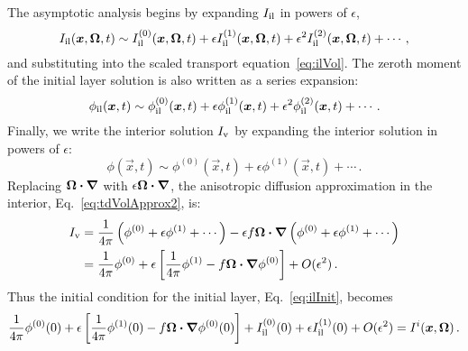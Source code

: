 The asymptotic analysis begins by expanding $I_\mathrm{il}$ in powers of $\epsilon$,
\begin{equation*}
  I_\mathrm{il}(\bm{x},\bm{\Omega},t) \sim I_\mathrm{il}^{(0)}(\bm{x},\bm{\Omega},t)
  + \epsilon I_\mathrm{il}^{(1)}(\bm{x},\bm{\Omega},t)
  + \epsilon^2 I_\mathrm{il}^{(2)}(\bm{x},\bm{\Omega},t)
  + \cdots\,,
\end{equation*}
and substituting into the scaled transport equation~\eqref{eq:ilVol}. The zeroth
moment of the
initial layer solution is also written as a series expansion:
\begin{equation*}
  \phi_\mathrm{il}(\bm{x},t) \sim \phi_\mathrm{il}^{(0)}(\bm{x},t)
  + \epsilon \phi_\mathrm{il}^{(1)}(\bm{x},t)
  + \epsilon^2 \phi_\mathrm{il}^{(2)}(\bm{x},t)
  + \cdots\,.
\end{equation*}
Finally, we write the interior solution $I_\mathrm{v}$ by expanding the interior solution
in powers of $\epsilon$:
\begin{equation*}
  \phi(\vec{x},t) \sim \phi^{(0)}(\vec{x},t)
  + \epsilon \phi^{(1)}(\vec{x},t)
  + \cdots\,.
\end{equation*}
Replacing $\bm{\Omega}\bm{\cdot}\bm{\nabla}$ with $\epsilon \bm{\Omega}\bm{\cdot}\bm{\nabla}$, the
anisotropic diffusion approximation in the interior,
Eq.~\eqref{eq:tdVolApprox2}, is:
\begin{align*}
  I_\mathrm{v}
 &= \frac{1}{4\pi} \left( \phi^{(0)} + \epsilon \phi^{(1)} + \cdots\right)
  - \epsilon f \bm{\Omega} \bm{\cdot} \bm{\nabla} \left( \phi^{(0)}
    + \epsilon \phi^{(1)} + \cdots\right)
\\
  &= \frac{1}{4\pi} \phi^{(0)} + \epsilon \left[ \frac{1}{4\pi} \phi^{(1)}
    - f \bm{\Omega} \bm{\cdot} \bm{\nabla} \phi^{(0)} \right] + O(\epsilon^2)\,.
\end{align*}
Thus the initial condition for the initial layer, Eq.~\eqref{eq:ilInit},
becomes
\begin{equation}\label{eq:ilInit2}
 \frac{1}{4\pi} \phi^{(0)}(0) + \epsilon \left[ \frac{1}{4\pi} \phi^{(1)}(0)
    - f \bm{\Omega} \bm{\cdot} \bm{\nabla} \phi^{(0)}(0) \right] 
    + I_\mathrm{il}^{(0)}(0) + \epsilon  I_\mathrm{il}^{(1)}(0) + O(\epsilon^2)
 = I^i(\bm{x},\bm{\Omega})\,.
\end{equation}

